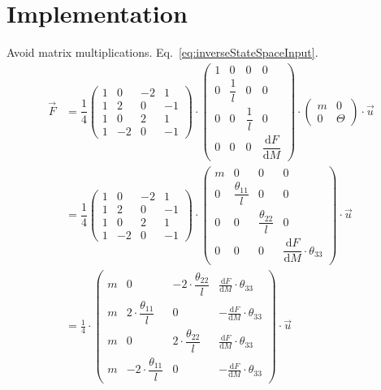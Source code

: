 \section{Implementation}
Avoid matrix multiplications. Eq.~\ref{eq:inverseStateSpaceInput}.
\begin{align*}
	\vec{F} &= \dfrac{1}{4}\begin{pmatrix}
	1 &  0 & -2 &  1 \\
	1 &  2 &  0 & -1 \\
	1 &  0 &  2 &  1 \\
	1 & -2 &  0 & -1
	\end{pmatrix}
	\cdot
	\begin{pmatrix}
	1 & 0 & 0 & 0 \\
	0 & \dfrac{1}{l} & 0 & 0 \\
	0 & 0 & \dfrac{1}{l} & 0 \\
	0 & 0 & 0 & \dfrac{\text{d}F}{\text{d}M}
	\end{pmatrix} \cdot
	\begin{pmatrix}
	m & 0 \\
	0 & \Theta
	\end{pmatrix} \cdot \vec{u}
	\\
	&= \dfrac{1}{4}\begin{pmatrix}
	1 &  0 & -2 &  1 \\
	1 &  2 &  0 & -1 \\
	1 &  0 &  2 &  1 \\
	1 & -2 &  0 & -1
	\end{pmatrix} 
	\cdot 
	\begin{pmatrix}
	m & 0 & 0 & 0 \\
	0 & \dfrac{\theta_{11}}{l} & 0 & 0 \\
	0 & 0 & \dfrac{\theta_{22}}{l} & 0 \\
	0 & 0 & 0 & \dfrac{\text{d}F}{\text{d}M} \cdot \theta_{33}
	\end{pmatrix} \cdot \vec{u}
	\\
	&= \frac{1}{4} \cdot 
	\begin{pmatrix}
		m & 0 & -2\cdot \dfrac{\theta_{22}}{l} & \frac{\text{d}F}{\text{d}M} \cdot \theta_{33}
		\\
		m & 2\cdot \dfrac{\theta_{11}}{l} & 0 & -\frac{\text{d}F}{\text{d}M} \cdot \theta_{33}
		\\
		m & 0 & 2\cdot \dfrac{\theta_{22}}{l} & \frac{\text{d}F}{\text{d}M} \cdot \theta_{33}
		\\
		m & -2\cdot \dfrac{\theta_{11}}{l} & 0 & -\frac{\text{d}F}{\text{d}M} \cdot \theta_{33}
	\end{pmatrix} \cdot \vec{u}

\end{align*}
